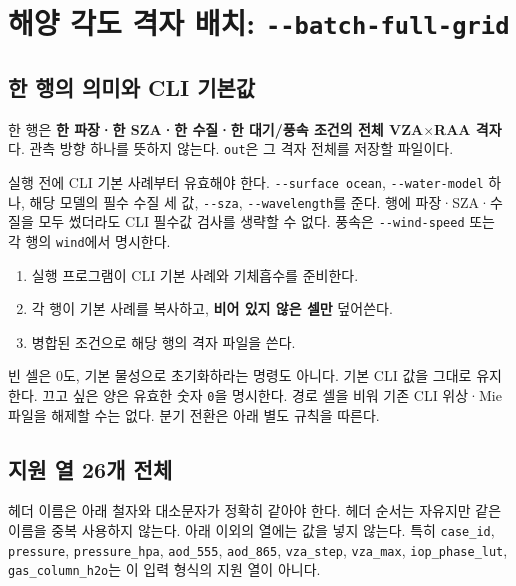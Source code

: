 \section{해양 각도 격자 배치: \texttt{-\allowbreak{}-\allowbreak{}batch-\allowbreak{}full-\allowbreak{}grid}}
\label{sec:auto:08_input_formats:2}
\subsection{한 행의 의미와 CLI 기본값}
\label{sec:auto:08_input_formats:2.1}
한 행은 \textbf{한 파장·한 SZA·한 수질·한 대기/풍속 조건의 전체 VZA\ensuremath{\times}RAA 격자}다. 관측 방향 하나를 뜻하지 않는다. \texttt{out}은 그 격자 전체를 저장할 파일이다.

실행 전에 CLI 기본 사례부터 유효해야 한다. \texttt{-\allowbreak{}-\allowbreak{}surface ocean}, \texttt{-\allowbreak{}-\allowbreak{}water-\allowbreak{}model} 하나, 해당 모델의 필수 수질 세 값, \texttt{-\allowbreak{}-\allowbreak{}sza}, \texttt{-\allowbreak{}-\allowbreak{}wavelength}를 준다. 행에 파장·SZA·수질을 모두 썼더라도 CLI 필수값 검사를 생략할 수 없다. 풍속은 \texttt{-\allowbreak{}-\allowbreak{}wind-\allowbreak{}speed} 또는 각 행의 \texttt{wind}에서 명시한다.

\begin{enumerate}
\item 실행 프로그램이 CLI 기본 사례와 기체흡수를 준비한다.
\item 각 행이 기본 사례를 복사하고, \textbf{비어 있지 않은 셀만} 덮어쓴다.
\item 병합된 조건으로 해당 행의 격자 파일을 쓴다.
\end{enumerate}

빈 셀은 0도, 기본 물성으로 초기화하라는 명령도 아니다. 기본 CLI 값을 그대로 유지한다. 끄고 싶은 양은 유효한 숫자 \texttt{0}을 명시한다. 경로 셀을 비워 기존 CLI 위상·Mie 파일을 해제할 수는 없다. 분기 전환은 아래 별도 규칙을 따른다.

\subsection{지원 열 26개 전체}
\label{sec:auto:08_input_formats:2.2}
헤더 이름은 아래 철자와 대소문자가 정확히 같아야 한다. 헤더 순서는 자유지만 같은 이름을 중복 사용하지 않는다. 아래 이외의 열에는 값을 넣지 않는다. 특히 \texttt{case\_\allowbreak{}id}, \texttt{pressure}, \texttt{pressure\_\allowbreak{}hpa}, \texttt{aod\_\allowbreak{}555}, \texttt{aod\_\allowbreak{}865}, \texttt{vza\_\allowbreak{}step}, \texttt{vza\_\allowbreak{}max}, \texttt{iop\_\allowbreak{}phase\_\allowbreak{}lut}, \texttt{gas\_\allowbreak{}column\_\allowbreak{}h2o}는 이 입력 형식의 지원 열이 아니다.


